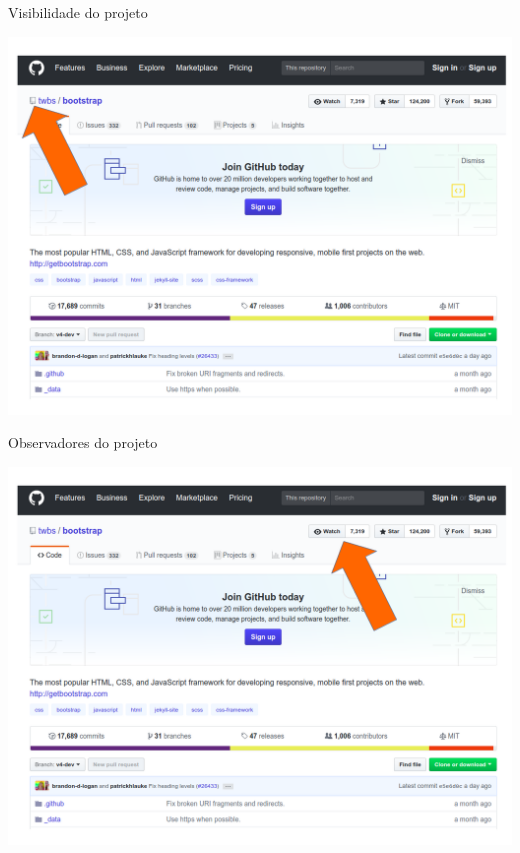 \documentclass{beamer}
\begin{document}
\begin{frame}{Visibilidade do projeto}
  \begin{center}
       \includegraphics[height=0.7\paperheight]{visibilidade_projeto.png} \\
      \end{center}
 
\end{frame}
\begin{frame}{Observadores do projeto}
  \begin{center}
       
\includegraphics[height=0.7\paperheight]{views_projeto.png} \\
      \end{center}
 
\end{frame}
\end{document}

